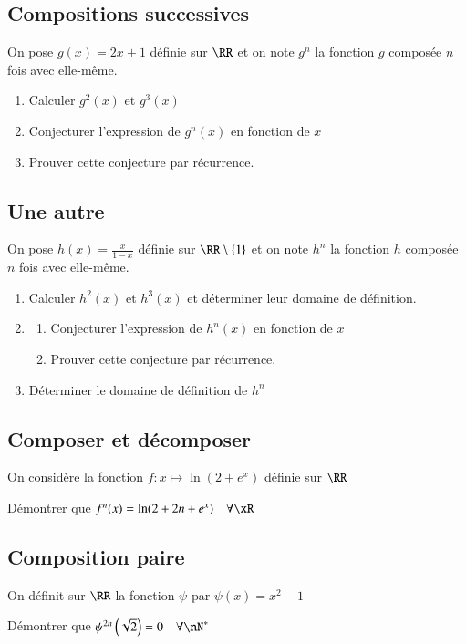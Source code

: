 \documentclass[oneside,12pt]{article}          %
\begin{document}
\subsection{Compositions successives}
On pose $g(x)=2x+1$ définie sur $\RR$ et on note $g^n$ la fonction $g$ composée $n$ fois avec elle-même.
\begin{enumerate}
	\item Calculer $g^2(x)$ et $g^3(x)$
	\item Conjecturer l'expression de $g^n(x)$ en fonction de $x$
	\item Prouver cette conjecture par récurrence.
\end{enumerate}



\subsection{Une autre}
On pose $h(x)=\frac{x}{1-x}$ définie sur $\RR\setminus\{1\}$ et on note $h^n$ la fonction $h$ composée $n$ fois avec elle-même.
\begin{enumerate}
	\item Calculer $h^2(x)$ et $h^3(x)$ et déterminer leur domaine de définition.
	\item \begin{enumerate}
		\item Conjecturer l'expression de $h^n(x)$ en fonction de $x$
		\item Prouver cette conjecture par récurrence.
	\end{enumerate}	 
	\item Déterminer le domaine de définition de $h^n$
\end{enumerate}



\subsection{Composer et décomposer}
On considère la fonction $f:x\mapsto \ln(2+e^x)$ définie sur $\RR$

Démontrer que $f^n(x)=\ln(2+2n+e^x) \quad \forall\xR$



\subsection{Composition paire}
On définit sur $\RR$ la fonction $\psi$ par $\psi(x)=x^2-1$

Démontrer que $\psi^{2n}\left(\sqrt{2}\right)=0 \quad \forall\nN^*$
\end{document}

